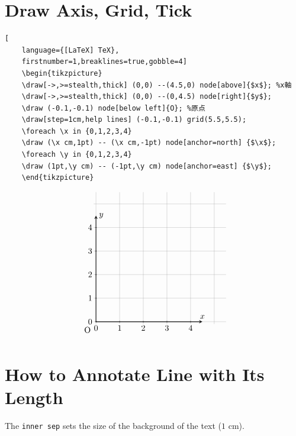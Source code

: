 \documentclass[lualatex]{jlreq}
\begin{document}
\section{Draw Axis, Grid, Tick}

\begin{lstlisting}[
    language={[LaTeX] TeX},
    firstnumber=1,breaklines=true,gobble=4]
    \begin{tikzpicture}
    \draw[->,>=stealth,thick] (0,0) --(4.5,0) node[above]{$x$}; %x軸
    \draw[->,>=stealth,thick] (0,0) --(0,4.5) node[right]{$y$};
    \draw (-0.1,-0.1) node[below left]{O}; %原点
    \draw[step=1cm,help lines] (-0.1,-0.1) grid(5.5,5.5);
    \foreach \x in {0,1,2,3,4}
    \draw (\x cm,1pt) -- (\x cm,-1pt) node[anchor=north] {$\x$};
    \foreach \y in {0,1,2,3,4}
    \draw (1pt,\y cm) -- (-1pt,\y cm) node[anchor=east] {$\y$};
    \end{tikzpicture}
\end{lstlisting}
\[
    \begin{tikzpicture}
    \draw[->,>=stealth,thick] (0,0) --(4.5,0) node[above]{$x$}; %
    \draw[->,>=stealth,thick] (0,0) --(0,4.5) node[right]{$y$};
    \draw (-0.1,-0.1) node[below left]{O}; %
    \draw[step=1cm,help lines] (-0.1,-0.1) grid(5.5,5.5);
    \foreach \x in {0,1,2,3,4}
    \draw (\x cm,1pt) -- (\x cm,-1pt) node[anchor=north] {$\x$};
    \foreach \y in {0,1,2,3,4}
    \draw (1pt,\y cm) -- (-1pt,\y cm) node[anchor=east] {$\y$};
    \end{tikzpicture}
\]

\section{How to Annotate Line with Its Length}

The \verb|inner sep| sets the size of the background of the text (\(1 \) cm).
\\[0.1em]
\end{document}
